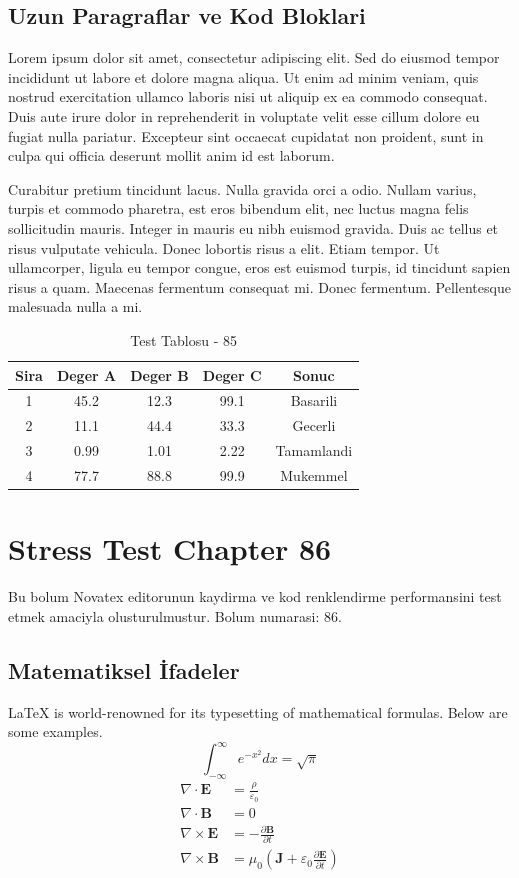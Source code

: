 \documentclass[12pt,a4paper]{article}
\begin{document}
\subsection{Uzun Paragraflar ve Kod Bloklari}
Lorem ipsum dolor sit amet, consectetur adipiscing elit. Sed do eiusmod tempor incididunt ut labore et dolore magna aliqua. Ut enim ad minim veniam, quis nostrud exercitation ullamco laboris nisi ut aliquip ex ea commodo consequat. Duis aute irure dolor in reprehenderit in voluptate velit esse cillum dolore eu fugiat nulla pariatur. Excepteur sint occaecat cupidatat non proident, sunt in culpa qui officia deserunt mollit anim id est laborum.

Curabitur pretium tincidunt lacus. Nulla gravida orci a odio. Nullam varius, turpis et commodo pharetra, est eros bibendum elit, nec luctus magna felis sollicitudin mauris. Integer in mauris eu nibh euismod gravida. Duis ac tellus et risus vulputate vehicula. Donec lobortis risus a elit. Etiam tempor. Ut ullamcorper, ligula eu tempor congue, eros est euismod turpis, id tincidunt sapien risus a quam. Maecenas fermentum consequat mi. Donec fermentum. Pellentesque malesuada nulla a mi.

\begin{table}[h!]
\centering
\begin{tabular}{|c|c|c|c|c|}
\hline
\textbf{Sira} & \textbf{Deger A} & \textbf{Deger B} & \textbf{Deger C} & \textbf{Sonuc} \\
\hline
1 & 45.2 & 12.3 & 99.1 & Basarili \\
2 & 11.1 & 44.4 & 33.3 & Gecerli \\
3 & 0.99 & 1.01 & 2.22 & Tamamlandi \\
4 & 77.7 & 88.8 & 99.9 & Mukemmel \\
\hline
\end{tabular}
\caption{Test Tablosu - 85}
\end{table}

\newpage
\section{Stress Test Chapter 86}
Bu bolum Novatex editorunun kaydirma ve kod renklendirme performansini test etmek amaciyla olusturulmustur. Bolum numarasi: 86.

\subsection{Matematiksel İfadeler}
\LaTeX{} is world-renowned for its typesetting of mathematical formulas. Below are some examples.
\begin{equation}
\int_{-\infty}^{\infty} e^{-x^2} dx = \sqrt{\pi}
\end{equation}
\begin{align}
\nabla \cdot \mathbf{E} &= \frac{\rho}{\varepsilon_0} \\
\nabla \cdot \mathbf{B} &= 0 \\
\nabla \times \mathbf{E} &= -\frac{\partial \mathbf{B}}{\partial t} \\
\nabla \times \mathbf{B} &= \mu_0\left(\mathbf{J} + \varepsilon_0 \frac{\partial \mathbf{E}}{\partial t}\right)
\end{align}
\end{document}
